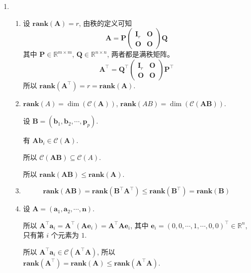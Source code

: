 \documentclass[11pt,letter,notitlepage]{article}
\newcommand{\rank}[1]{ \textbf{rank}  (#1)  }
\begin{document}
\begin{solution}
    \begin{enumerate}
        \item \begin{enumerate}
                  \item 设 $\rank{\mathbf{A}}=r$, 由秩的定义可知
                        $$\mathbf{A}=\mathbf{P}\begin{pmatrix}
                                \mathbf{I}_r & \mathbf{O} \\
                                \mathbf{O}   & \mathbf{O}
                            \end{pmatrix}\mathbf{Q}$$
                        其中 $\mathbf{P}\in\mathbb{R}^{m\times m}$, $\mathbf{Q}\in\mathbb{R}^{n\times n}$, 两者都是满秩矩阵。
                        $$\mathbf{A}^\top=\mathbf{Q}^\top\begin{pmatrix}
                                \mathbf{I}_r & \mathbf{O} \\
                                \mathbf{O}   & \mathbf{O}
                            \end{pmatrix}\mathbf{P}^\top$$
                        所以 $\rank{\mathbf{A}^\top}=r=\rank{\mathbf{A}}$.
                  \item $\rank{A}=\dim(\mathcal{C}( \mathbf{A} ))$, $\rank{AB}=\dim(\mathcal{C}( \mathbf{AB} ))$.

                        设 $\mathbf{B}=(\mathbf{b}_1,\mathbf{b}_2,\cdots,\mathbf{p}_p)$.

                        有 $\mathbf{A}\mathbf{b}_i\in\mathcal{C}(\mathbf{A})$.

                        所以 $\mathcal{C}(\mathbf{AB})\subseteq \mathcal{C}(A)$.

                        所以 $\rank{\mathbf{AB}}\leq\rank{\mathbf{A}}$.
                  \item $$\rank{\mathbf{AB}}=\rank{\mathbf{B}^\top\mathbf{A}^\top}\leq \rank{\mathbf{B}^\top}=\rank{\mathbf{B}}$$
                  \item 设 $\mathbf{A}=(\mathbf{a}_1,\mathbf{a}_2,\cdots,\mathbf{n})$.

                        所以 $\mathbf{A}^\top\mathbf{a}_i=\mathbf{A}^\top(\mathbf{A}\mathbf{e}_i)=\mathbf{A}^\top\mathbf{A}\mathbf{e}_i$, 其中 $\mathbf{e}_i =(0,0,\cdots,1,\cdots,0,0)^\top \in \mathbb{R}^n$, 只有第 $i$ 个元素为 $1$.

                        所以 $\mathbf{A}^\top\mathbf{a}_i \in \mathcal{C}(\mathbf{A}^\top \mathbf{A})$, 所以 $\rank{\mathbf{A}^\top}=\rank{\mathbf{A}}\leq \rank{\mathbf{A}^\top\mathbf{A}}$.


\end{enumerate}
\end{enumerate}
\end{solution}
\end{document}
